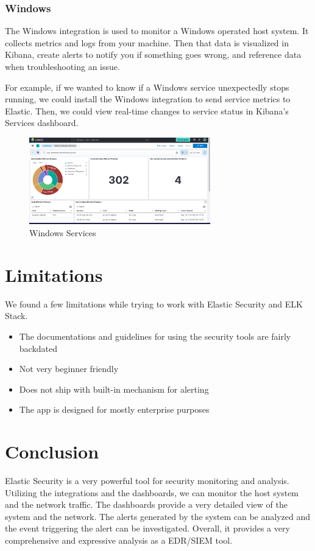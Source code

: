 \documentclass{report}
\begin{document}
\subsection{Windows}
The Windows integration is used to monitor a Windows operated host system.
It collects metrics and logs from your machine. 
Then that data is visualized in Kibana, 
create alerts to notify you if something goes wrong, and reference data when troubleshooting an issue.

For example, if we wanted to know if a Windows service unexpectedly stops running, 
we could install the Windows integration to send service metrics to Elastic. 
Then, we could view real-time changes to service status in Kibana's Services dashboard.

\begin{figure}
	\centering
	\includegraphics[width=0.7\textwidth]{Images/windows-services.png}
	\caption{Windows Services}
	\label{fig:Windows}
\end{figure}

\chapter{Limitations}
We found a few limitations while trying to work with Elastic Security and ELK Stack.
\begin{itemize}
	\item The documentations and guidelines for using the security tools are fairly backdated
	\item Not very beginner friendly
	\item Does not ship with built-in mechanism for alerting
	\item The app is designed for mostly enterprise purposes
\end{itemize}

\chapter{Conclusion}
Elastic Security is a very powerful tool for security monitoring and analysis.
Utilizing the integrations and the dashboards, we can monitor the host system and the network traffic.
The dashboards provide a very detailed view of the system and the network.
The alerts generated by the system can be analyzed and the event triggering the alert can be investigated.
Overall, it provides a very comprehensive and expressive analysis as a EDR/SIEM tool.
\end{document}
